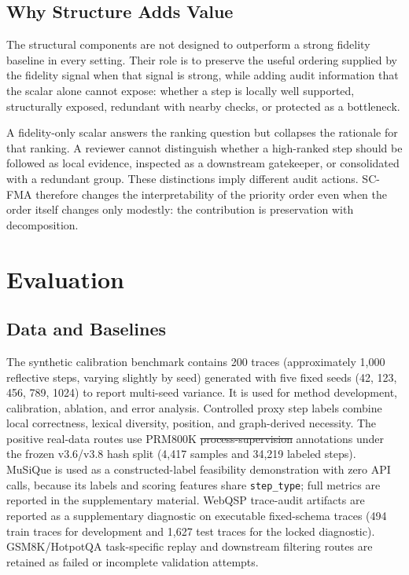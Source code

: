 \documentclass[a4paper,fleqn]{cas-sc}
\makeatletter
\providecommand{\DIFaddtex}[1]{{\protect\color{blue}\uwave{#1}}} %
\providecommand{\DIFdeltex}[1]{{\protect\color{red}\sout{#1}}} %
\providecommand{\DIFaddbegin}{} %
\providecommand{\DIFaddend}{} %
\providecommand{\DIFdelbegin}{} %
\providecommand{\DIFdelend}{} %
\providecommand{\DIFadd}[1]{\texorpdfstring{\DIFaddtex{#1}}{#1}} %
\providecommand{\DIFdel}[1]{\texorpdfstring{\DIFdeltex{#1}}{}} %
\providecommand{\DIFscaledelfig}{0.5}
\newlength{\DIFdelgraphicswidth} %
\newlength{\DIFdelgraphicsheight} %
\providecommand{\DIFaddincludegraphics}[2][]{{\color{blue}\fbox{\DIFOincludegraphics[#1]{#2}}}} %
\providecommand{\DIFdelincludegraphics}[2][]{%
\sbox{\DIFdelgraphicsbox}{\DIFOincludegraphics[#1]{#2}}%
\settoboxwidth{\DIFdelgraphicswidth}{\DIFdelgraphicsbox} %
\settoboxtotalheight{\DIFdelgraphicsheight}{\DIFdelgraphicsbox} %
\scalebox{\DIFscaledelfig}{%
\parbox[b]{\DIFdelgraphicswidth}{\usebox{\DIFdelgraphicsbox}\\[-\baselineskip] \rule{\DIFdelgraphicswidth}{0em}}\llap{\resizebox{\DIFdelgraphicswidth}{\DIFdelgraphicsheight}{%
\setlength{\unitlength}{\DIFdelgraphicswidth}%
\begin{picture}(1,1)%
\thicklines\linethickness{2pt} %
{\color[rgb]{1,0,0}\put(0,0){\framebox(1,1){}}}%
{\color[rgb]{1,0,0}\put(0,0){\line( 1,1){1}}}%
{\color[rgb]{1,0,0}\put(0,1){\line(1,-1){1}}}%
\end{picture}%
}\hspace*{3pt}}} %
} %
\DeclareRobustCommand{\DIFaddbegin}{\DIFOaddbegin \let\includegraphics\DIFaddincludegraphics} %
\DeclareRobustCommand{\DIFaddend}{\DIFOaddend \let\includegraphics\DIFOincludegraphics} %
\DeclareRobustCommand{\DIFdelbegin}{\DIFOdelbegin \let\includegraphics\DIFdelincludegraphics} %
\DeclareRobustCommand{\DIFdelend}{\DIFOaddend \let\includegraphics\DIFOincludegraphics} %
\let\sout@orig\sout %
\renewcommand{\sout}[1]{\ifmmode\text{\sout@orig{\ensuremath{#1}}}\else\sout@orig{#1}\fi} %
\makeatother
\begin{document}
\subsection{Why Structure Adds Value}

The structural components are not designed to outperform a strong fidelity baseline in every setting. Their role is to preserve the useful ordering supplied by the fidelity signal when that signal is strong, while adding audit information that the scalar alone cannot expose: whether a step is locally well supported, structurally exposed, redundant with nearby checks, or protected as a bottleneck.

A fidelity-only scalar answers the ranking question but collapses the rationale for that ranking. A reviewer cannot distinguish whether a high-ranked step should be followed as local evidence, inspected as a downstream gatekeeper, or consolidated with a redundant group. These distinctions imply different audit actions. SC-FMA therefore changes the interpretability of the priority order even when the order itself changes only modestly: the contribution is preservation with decomposition.

\section{Evaluation}

\subsection{Data and Baselines}

The synthetic calibration benchmark contains 200 traces (approximately 1,000 reflective steps, varying slightly by seed) generated with five fixed seeds (42, 123, 456, 789, 1024) to report multi-seed variance. It is used for method development, calibration, ablation, and error analysis. Controlled proxy step labels combine local correctness, lexical diversity, position, and graph-derived necessity. The positive real-data routes use PRM800K \DIFdelbegin \DIFdel{process-supervision }\DIFdelend \DIFaddbegin \DIFadd{process supervision }\DIFaddend annotations under the frozen v3.6/v3.8 hash split (4,417 samples and 34,219 labeled steps). MuSiQue is used as a constructed-label feasibility demonstration with zero API calls, because its labels and scoring features share \texttt{step\_type}; full metrics are reported in the supplementary material. WebQSP trace-audit artifacts are reported as a supplementary diagnostic on executable fixed-schema traces (494 train traces for development and 1,627 test traces for the locked diagnostic). GSM8K/HotpotQA task-specific replay and downstream filtering routes are retained as failed or incomplete validation attempts.
\end{document}
